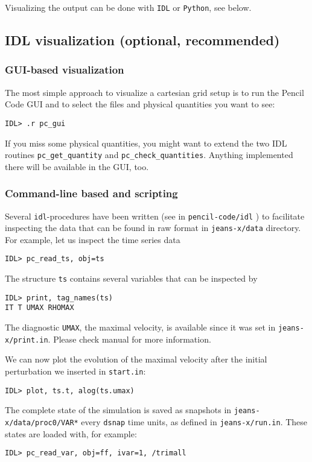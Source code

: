 \documentclass[a4paper,12pt]{article}
\begin{document}
Visualizing the output can be done with \verb|IDL| or \verb|Python|, see below.

\subsection{IDL visualization (optional, recommended)}

\subsubsection{GUI-based visualization}
The most simple approach to visualize a cartesian grid setup is to run the Pencil Code GUI and to select the files and physical quantities you want to see:
\begin{verbatim}
IDL> .r pc_gui
\end{verbatim}
If you miss some physical quantities, you might want to extend the two IDL routines \verb|pc_get_quantity| and \verb|pc_check_quantities|. Anything implemented there will be available in the GUI, too.

\subsubsection{Command-line based and scripting}
Several \verb|idl|-procedures have been written
(see in \verb|pencil-code/idl| ) to facilitate inspecting the data
that can be found in raw format in \verb|jeans-x/data| directory.
For example, let us inspect the time series data
\begin{verbatim}
IDL> pc_read_ts, obj=ts
\end{verbatim}
The structure \verb|ts| contains several variables that can be inspected by
\begin{verbatim}
IDL> print, tag_names(ts)
IT T UMAX RHOMAX
\end{verbatim}
The diagnostic \verb|UMAX|, the maximal velocity, is available since it was set
in \verb|jeans-x/print.in|. Please check manual for more information.

We can now plot the evolution of the maximal velocity after the initial perturbation we inserted in \verb|start.in|:
\begin{verbatim}
IDL> plot, ts.t, alog(ts.umax)
\end{verbatim}

The complete state of the simulation is saved as snapshots in
\verb|jeans-x/data/proc0/VAR*| every \verb|dsnap| time units,
as defined in \verb|jeans-x/run.in|.
These states are loaded with, for example:
\begin{verbatim}
IDL> pc_read_var, obj=ff, ivar=1, /trimall
\end{verbatim}
\end{document}
